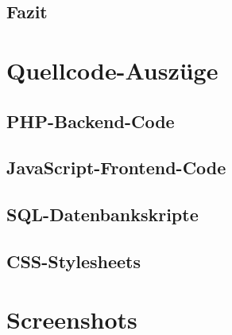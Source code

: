 \documentclass[11pt,a4paper]{article}
\begin{document}
\subsection{Fazit}

\appendix

\section{Quellcode-Auszüge}

\subsection{PHP-Backend-Code}

\subsection{JavaScript-Frontend-Code}

\subsection{SQL-Datenbankskripte}

\subsection{CSS-Stylesheets}

\section{Screenshots}
\end{document}
